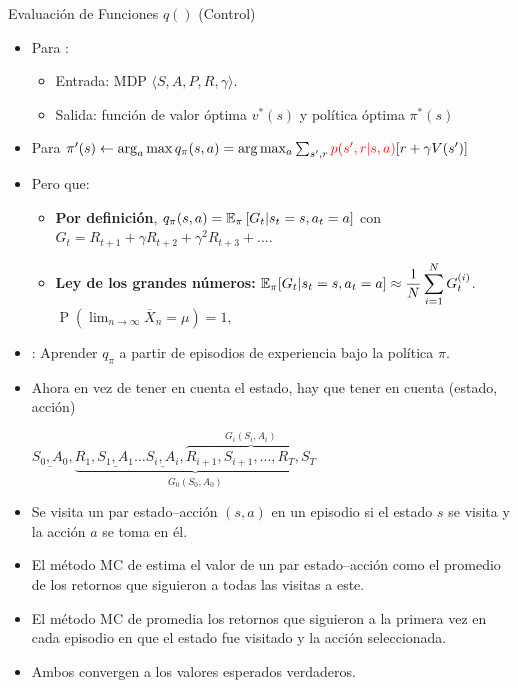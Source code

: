 \documentclass[10pt, envcountsect, handout, aspectratio=1610, hyperref={hypertexnames=true}]{beamer}
\begin{document}
\begin{frame}{Evaluación de Funciones $q()$ (Control)}
	
	\begin{itemize}
		\item Para :  
		\begin{itemize}
			\item Entrada: MDP $\langle S,A,P,R, \gamma \rangle$.  
			\item Salida: función de valor óptima $v^*(s)$ y política óptima $\pi^*(s)$
			
		\end{itemize}
		
		\item Para    $\pi'(s) \gets \arg_a\max q_\pi(s,a) = \arg\max_a \sum_{s', r} {\color{red} p(s', r | s, a)} [r + \gamma V(s')]$
		
		\item Pero  que:
		
		\begin{itemize}
			\item \textbf{Por definición}, $\displaystyle q_\pi(s,a) = \mathbb{E}_\pi \left[ G_t| s_t=s, a_t=a \right]$ con $	G_t = R_{t+1} + \gamma R_{t+2} + \gamma^2 R_{t+3} + \dots $.
			
			\item\textbf{ Ley de los grandes números:} $\displaystyle\mathbb{E}_\pi[G_t|s_t=s, a_t=a] \approx  \frac{1}{N} \sum_{i=1}^{N} G_t^{(i)}$. \hfill$ {\displaystyle \operatorname {P} \left(\lim _{n\rightarrow \infty }{\overline {X}}_{n}=\mu \right)=1,}$ 
		\end{itemize}
		
		
		
		
		\item {}: Aprender $q_\pi$ a partir de episodios de experiencia bajo la política $\pi$.
		
		\item Ahora en vez de tener en cuenta el estado, hay que tener en cuenta (estado, acción)
		
		\centerline{\footnotesize $\underline{S_0, A_0}, \underbrace{R_1, \underline{S_1, A_1} \ldots \underline{S_i,A_i}, \overbrace{R_{i+1},{S_{i+1},\ldots, R_T, S_T}}^{G_i(S_i, A_i)}}_{G_0 (S_0, A_0)}$}
		
		\item Se visita un par estado–acción \((s, a)\) en un episodio si el estado \(s\) se visita y la acción \(a\) se toma en él.
		
		\item El método MC de  estima el valor de un par estado–acción como el promedio de los retornos que siguieron a todas las visitas a este. 
		\item El método MC de  promedia los retornos que siguieron a la primera vez en cada episodio en que el estado fue visitado y la acción seleccionada. 
		\item Ambos  convergen  a los valores esperados verdaderos.
	\end{itemize}
	
\end{frame}
\end{document}
